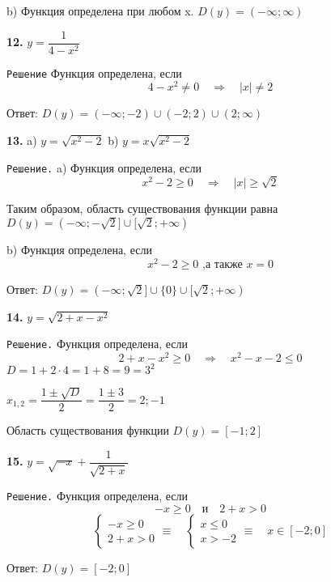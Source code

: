 \documentclass[12pt]{article}
\begin{document}
	b) Функция определена при любом x. $D(y) = (-\infty; \infty)$\vspace{2mm}
	
	{\bf 12.} $y = \dfrac{1}{4-x^2}$\vspace{2mm}
	
	{\tt Решение} Функция определена, если
	\[
		4-x^2 \neq 0 \quad\Longrightarrow\quad |x|\neq2
	\]
	
	Ответ: $D(y) = (-\infty; -2)\cup(-2; 2)\cup(2;\infty)$\vspace{2mm}
	
	{\bf 13.} a) $y = \sqrt{x^2-2}$ \quad b) $y=x\sqrt{x^2-2}$
	
	{\tt Решение.} a) Функция определена, если
	\[
		x^2-2\ge 0\quad\Longrightarrow\quad|x|\ge\sqrt{2}
	\]
	
	Таким образом, область существования функции равна $D(y) = (-\infty; -\sqrt{2}]\cup[\sqrt{2};+\infty)$ 
	
	b) Функция определена, если 
	\[
		x^2-2\ge0 \text{ ,а также }x=0
	\]
	
	\hspace{-2mm}Ответ: $D(y) = (-\infty;\sqrt{2}]\cup\{0\}\cup[\sqrt{2};+\infty)$\vspace{2mm}
	
	{\bf 14.} $y=\sqrt{2+x-x^2}$
	
	{\tt Решение.} Функция определена, если
	\[
		2+x-x^2\ge0\quad\Longrightarrow\quad x^2-x-2\le0
	\]
	\qquad$D = 1+2\cdot4 = 1+8 = 9 = 3^2$\vspace{2mm}
	
	$x_{1,2} = \dfrac{1\pm\sqrt{D}}{2} = \dfrac{1\pm3}{2} = 2;-1$\vspace{2mm}
	
	Область существования функции $D(y) = [-1;2]$\vspace{2mm}
	
	{\bf 15.} $y = \sqrt{-x} +\dfrac{1}{\sqrt{2+x}}$
	
	{\tt Решение.} Функция определена, если 
	\[
		-x\ge0 \quad\text{и}\quad 2+x>0
	\]
	\begin{equation*}
	\begin{cases}
		-x\ge0 \\
		2+x>0
	\end{cases}\equiv\quad
	\begin{cases}
		x\le 0\\x>-2
	\end{cases}\equiv\quad x\in[-2;0]
	\end{equation*}
	
	Ответ: $D(y) = [-2;0]$
	\vspace{2mm}
	
\end{document}
